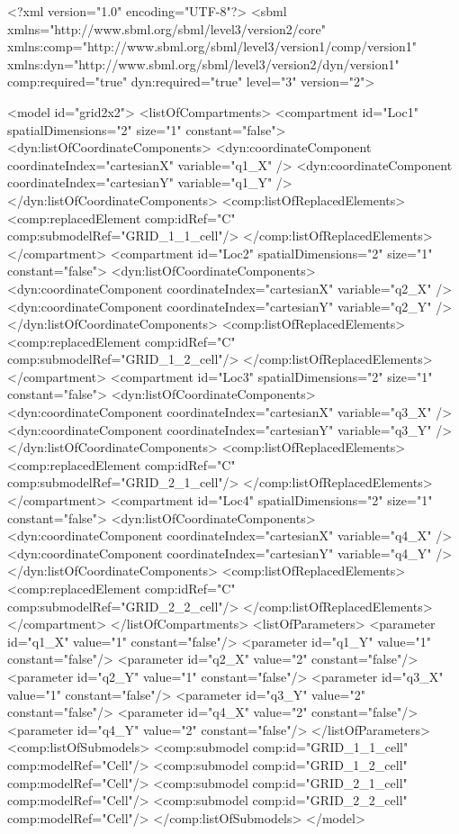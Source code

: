 \begin{example}
<?xml version="1.0" encoding="UTF-8"?>
	<sbml xmlns="http://www.sbml.org/sbml/level3/version2/core" 
		  xmlns:comp="http://www.sbml.org/sbml/level3/version1/comp/version1"
		  xmlns:dyn="http://www.sbml.org/sbml/level3/version2/dyn/version1"
		  comp:required="true" dyn:required="true" level="3" version="2">

	<model id="grid2x2">
		<listOfCompartments>
			<compartment id="Loc1" spatialDimensions="2" size="1" constant="false">
				<dyn:listOfCoordinateComponents>
					<dyn:coordinateComponent coordinateIndex="cartesianX" variable="q1_X" />
					<dyn:coordinateComponent coordinateIndex="cartesianY" variable="q1_Y" />
				</dyn:listOfCoordinateComponents>
				<comp:listOfReplacedElements>
					<comp:replacedElement comp:idRef="C" comp:submodelRef="GRID_1_1_cell"/>
				</comp:listOfReplacedElements>
			</compartment>	
			<compartment id="Loc2" spatialDimensions="2" size="1" constant="false">
				<dyn:listOfCoordinateComponents>
					<dyn:coordinateComponent coordinateIndex="cartesianX" variable="q2_X" />
					<dyn:coordinateComponent coordinateIndex="cartesianY" variable="q2_Y" />
				</dyn:listOfCoordinateComponents>
				<comp:listOfReplacedElements>
					<comp:replacedElement comp:idRef="C" comp:submodelRef="GRID_1_2_cell"/>
				</comp:listOfReplacedElements>
			</compartment>	
			<compartment id="Loc3" spatialDimensions="2" size="1" constant="false">
				<dyn:listOfCoordinateComponents>
					<dyn:coordinateComponent coordinateIndex="cartesianX" variable="q3_X" />
					<dyn:coordinateComponent coordinateIndex="cartesianY" variable="q3_Y" />
				</dyn:listOfCoordinateComponents>
				<comp:listOfReplacedElements>
					<comp:replacedElement comp:idRef="C" comp:submodelRef="GRID_2_1_cell"/>
				</comp:listOfReplacedElements>
			</compartment>	
			<compartment id="Loc4" spatialDimensions="2" size="1" constant="false">
				<dyn:listOfCoordinateComponents>
					<dyn:coordinateComponent coordinateIndex="cartesianX" variable="q4_X" />
					<dyn:coordinateComponent coordinateIndex="cartesianY" variable="q4_Y" />
				</dyn:listOfCoordinateComponents>
				<comp:listOfReplacedElements>
					<comp:replacedElement comp:idRef="C" comp:submodelRef="GRID_2_2_cell"/>
				</comp:listOfReplacedElements>
			</compartment>	
		</listOfCompartments>
		<listOfParameters>
			<parameter id="q1_X" value="1" constant="false"/>
			<parameter id="q1_Y"  value="1" constant="false"/>
			<parameter id="q2_X" value="2" constant="false"/>
			<parameter id="q2_Y"  value="1" constant="false"/>
			<parameter id="q3_X" value="1" constant="false"/>
			<parameter id="q3_Y"  value="2" constant="false"/>
			<parameter id="q4_X" value="2" constant="false"/>
			<parameter id="q4_Y"  value="2" constant="false"/>
		</listOfParameters>
		<comp:listOfSubmodels>
			<comp:submodel comp:id="GRID_1_1_cell" comp:modelRef="Cell"/>
			<comp:submodel comp:id="GRID_1_2_cell" comp:modelRef="Cell"/>
			<comp:submodel comp:id="GRID_2_1_cell" comp:modelRef="Cell"/>
			<comp:submodel comp:id="GRID_2_2_cell" comp:modelRef="Cell"/>
		</comp:listOfSubmodels>
	</model>


\end{example}
